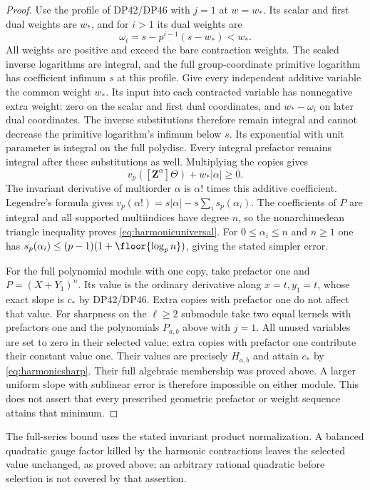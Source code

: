 \documentclass[11pt,a4paper]{article}
\theoremstyle{definition}\newtheorem{remark}[theorem]{Remark}
\newcommand{\vp}{v_p}\newcommand{\dR}{\mathrm{dR}}\newcommand{\crys}{\mathrm{crys}}
\begin{document}
\begin{proof}
Use the profile of DP42/DP46 with $j=1$ at $w=w_*$.
Its scalar and first dual weights are $w_*$, and for $i>1$ its dual weights are
\[
 \omega_i=s-p^{i-1}(s-w_*)<w_*.
\]
All weights are positive and exceed the bare contraction weights.
The scaled inverse logarithms are integral, and the full group-coordinate primitive logarithm has coefficient infimum $s$ at this profile.
Give every independent additive variable the common weight $w_*$.
Its input into each contracted variable has nonnegative extra weight: zero on the scalar and first dual coordinates, and $w_*-\omega_i$ on later dual coordinates.
The inverse substitutions therefore remain integral and cannot decrease the primitive logarithm's infimum below $s$.
Its exponential with unit parameter is integral on the full polydisc.
Every integral prefactor remains integral after these substitutions as well.
Multiplying the copies gives
\[
 \vp([\mathbf Z^\alpha]\Theta)+w_*|\alpha|\ge0.
\]
The invariant derivative of multiorder $\alpha$ is $\alpha!$ times this additive coefficient.
Legendre's formula gives
$\vp(\alpha!)=s|\alpha|-s\sum_i s_p(\alpha_i)$.
The coefficients of $P$ are integral and all supported multiindices have degree $n$, so the nonarchimedean triangle inequality proves \eqref{eq:harmonicuniversal}.
For $0\le\alpha_i\le n$ and $n\ge1$ one has
$s_p(\alpha_i)\le(p-1)(1+\floor{\log_p n})$, giving the stated simpler error.

For the full polynomial module with one copy, take prefactor one and $P=(X+Y_1)^n$.
Its value is the ordinary derivative along $x=t,y_1=t$, whose exact slope is $c_*$ by DP42/DP46.
Extra copies with prefactor one do not affect that value.
For sharpness on the $\ell\ge2$  submodule take two equal kernels with prefactors one and the polynomials $P_{a,b}$ above with $j=1$.
All unused variables are set to zero in their selected value; extra copies with prefactor one contribute their constant value one.
Their values are precisely $H_{a,b}$ and attain $c_*$ by \eqref{eq:harmonicsharp}.
Their full algebraic  membership was proved above.
A larger uniform slope with sublinear error is therefore impossible on either module.
This does not assert that every prescribed geometric prefactor or weight sequence attains that minimum.
\end{proof}

The full-series bound uses the stated invariant product normalization.
A balanced quadratic gauge factor killed by the harmonic contractions leaves the selected value unchanged, as proved above; an arbitrary rational quadratic before selection is not covered by that assertion.
\end{document}
